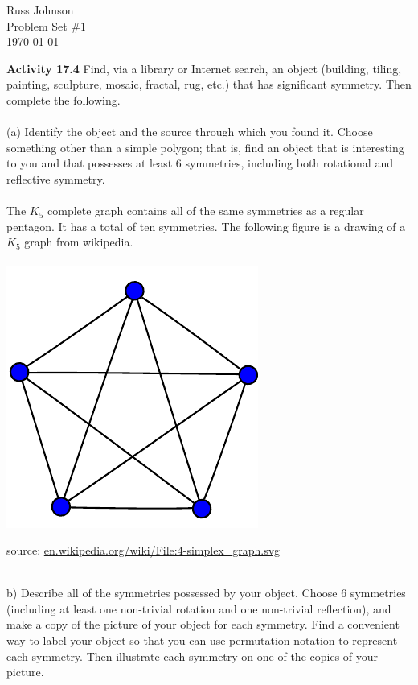 \documentclass[11pt,a4paper]{article}
\begin{document}
\begin{flushright}
Russ Johnson\\
Problem Set $\#1$\\
\today\\
\end{flushright}

{\bf Activity 17.4} Find, via a library or Internet search, an object (building, tiling,
painting, sculpture, mosaic, fractal, rug, etc.) that has significant symmetry. Then
complete the following.\\
~\\
(a) Identify the object and the source through which you found it. Choose something other than a simple polygon; that is, find an object that is interesting to you and that possesses at least 6 symmetries, including both rotational and reflective symmetry.\\
~\\
The $K_5$ complete graph contains all of the same symmetries as a regular pentagon. It has a total of ten symmetries. The following figure is a drawing of a $K_5$ graph from wikipedia. \\
~\\
\includegraphics[scale=1]{./graphics/4-simplex_graph.pdf}
\begin{flushright}
source: \url{en.wikipedia.org/wiki/File:4-simplex_graph.svg}
\end{flushright}
~\\
b) Describe all of the symmetries possessed by your object. Choose 6 symmetries (including at least one non-trivial rotation and one non-trivial reflection), and make a copy of the picture of your object for each symmetry.
Find a convenient way to label your object so that you can use permutation notation to represent each symmetry. Then illustrate each symmetry on one of the copies of your picture.\\
\end{document}
